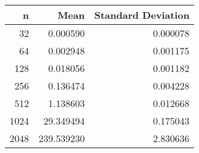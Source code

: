 \begin{tabular}{rrr}
\toprule
    n &        Mean &  Standard Deviation \\
\midrule
   32 &    0.000590 &            0.000078 \\
   64 &    0.002948 &            0.001175 \\
  128 &    0.018056 &            0.001182 \\
  256 &    0.136474 &            0.004228 \\
  512 &    1.138603 &            0.012668 \\
 1024 &   29.349494 &            0.175043 \\
 2048 &  239.539230 &            2.830636 \\
\bottomrule
\end{tabular}
